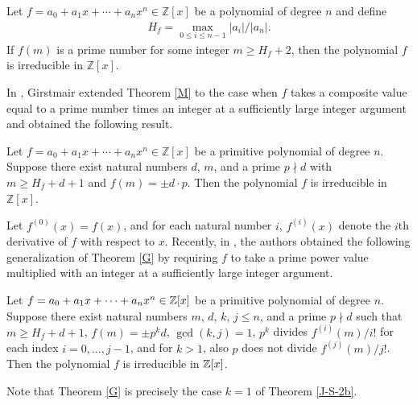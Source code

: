 \documentclass[12pt,reqno]{amsart}%
\begin{document}
\begin{thmx}[\cite{Mu}]\label{M} Let $f=a_0+a_1x+\cdots +a_nx^n\in \mathbb Z[x]$ be a polynomial of degree $n$ and define
\begin{eqnarray*}
H_f=\max_{0\leq i\leq n-1}|a_i|/|a_n|.
\end{eqnarray*}
If $f(m)$ is a prime number for some integer $m\geq H_f+2$, then the polynomial $f$ is irreducible in $\mathbb{Z}[x]$.
\end{thmx}
In \cite{G}, Girstmair extended Theorem \ref{M} to the case when $f$ takes a composite value equal to a prime number times an integer at a sufficiently large integer argument and obtained the following result.
\begin{thmx}[\cite{G}]\label{G}
Let $f=a_0+a_1x+\cdots +a_nx^n\in \mathbb Z[x]$ be a primitive polynomial of degree $n$. Suppose there exist natural numbers $d$,  $m$, and a prime $p\nmid d$  with $m\geq H_f+d+1$ and $f(m)=\pm d\cdot p$. Then the polynomial $f$ is irreducible in $\mathbb{Z}[x]$.
\end{thmx}
Let $f^{(0)}(x)=f(x)$, and for each natural number $i$, $f^{(i)}(x)$ denote the $i$th derivative of $f$ with respect to $x$.
Recently, in \cite{J-S-2}, the authors obtained the following generalization of Theorem \ref{G} by requiring $f$ to take a prime power value multiplied with an integer at a sufficiently large integer argument.
\begin{thmx}[\cite{J-S-2}]\label{J-S-2b}
Let $f=a_0+a_1 x+\cdots+a_nx^n\in \Bbb{Z}[x]$ be a primitive polynomial  of degree $n$. Suppose there exist natural numbers $m$, $d$, $k$, $j\leq n$, and a prime $p\nmid d$ such that $m\geq H_f+d+1$, $f(m)=\pm p^k d$, $\gcd(k,j)=1$, $p^k$ divides ${f^{(i)}(m)}/{i!}$ for each index $i=0,\ldots,j-1$, and for $k>1$, also $p$ does not divide ${f^{(j)}(m)}/{j!}$. Then the polynomial $f$ is irreducible in $\Bbb{Z}[x]$.
\end{thmx}
Note that Theorem \ref{G} is precisely the case $k=1$ of Theorem \ref{J-S-2b}.
\end{document}
